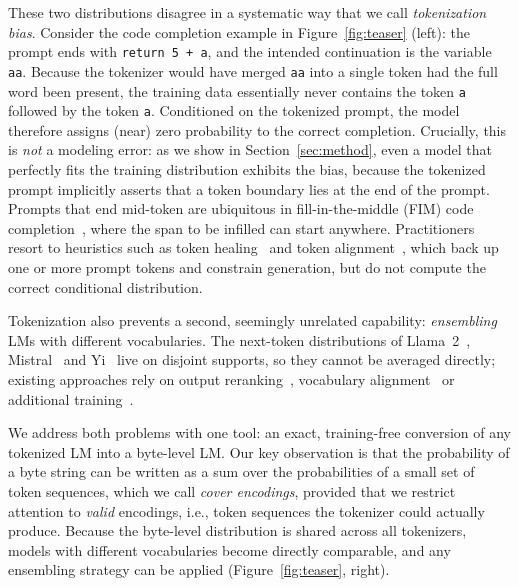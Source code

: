 \documentclass{article} %
\newcommand{\tok}[1]{\texttt{#1}}
\begin{document}
These two distributions disagree in a systematic way that we call \emph{tokenization bias}. Consider the code completion example in Figure~\ref{fig:teaser} (left): the prompt ends with \tok{return 5 + a}, and the intended continuation is the variable \tok{aa}. Because the tokenizer would have merged \tok{aa} into a single token had the full word been present, the training data essentially never contains the token \tok{a} followed by the token \tok{a}. Conditioned on the tokenized prompt, the model therefore assigns (near) zero probability to the correct completion. Crucially, this is \emph{not} a modeling error: as we show in Section~\ref{sec:method}, even a model that perfectly fits the training distribution exhibits the bias, because the tokenized prompt implicitly asserts that a token boundary lies at the end of the prompt. Prompts that end mid-token are ubiquitous in fill-in-the-middle (FIM) code completion~\citep{bavarian2022fim,fried2023incoder,roziere2023codellama}, where the span to be infilled can start anywhere. Practitioners resort to heuristics such as token healing~\citep{lundberg2023tokenhealing,dagan2024tokenizer} and token alignment~\citep{athiwaratkun2024alignment}, which back up one or more prompt tokens and constrain generation, but do not compute the correct conditional distribution.

Tokenization also prevents a second, seemingly unrelated capability: \emph{ensembling} LMs with different vocabularies. The next-token distributions of Llama~2~\citep{touvron2023llama2}, Mistral~\citep{jiang2023mistral} and Yi~\citep{young2024yi} live on disjoint supports, so they cannot be averaged directly; existing approaches rely on output reranking~\citep{jiang2023llmblender}, vocabulary alignment~\citep{xu2024eva,huang2024deepen,yu2024gac} or additional training~\citep{wan2024fusellm}.

We address both problems with one tool: an exact, training-free conversion of any tokenized LM into a byte-level LM. Our key observation is that the probability of a byte string can be written as a sum over the probabilities of a small set of token sequences, which we call \emph{cover encodings}, provided that we restrict attention to \emph{valid} encodings, i.e., token sequences the tokenizer could actually produce. Because the byte-level distribution is shared across all tokenizers, models with different vocabularies become directly comparable, and any ensembling strategy can be applied (Figure~\ref{fig:teaser}, right).
\end{document}
